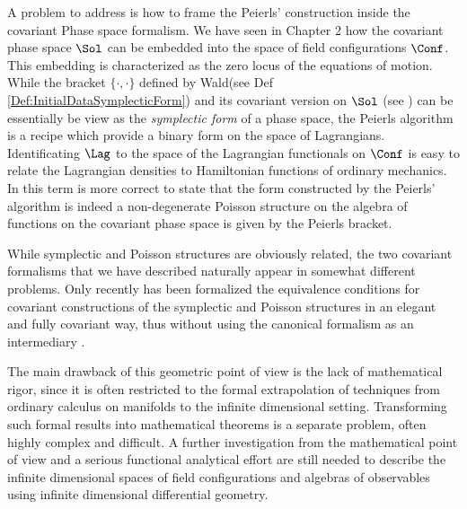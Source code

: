 \documentclass[Main]{subfiles}
\begin{document}
		\vspace{2mm}
		A problem to address is how to frame the Peierls' construction inside the covariant Phase space formalism.
		We have seen in Chapter 2 how the covariant phase space $\Sol$ can be embedded into the space of field configurations $\Conf$.
			This embedding is characterized as the zero locus of the equations of motion. 
			While the bracket $\{\cdot,\cdot\}$ defined by Wald\cite{Wald1994}(see Def \ref{Def:InitialDataSymplecticForm}) and its covariant version on $\Sol$ (see \cite{Khavkine2014}) can be essentially be view as the \emph{symplectic form} of a phase space,
			the Peierls algorithm is a recipe which provide a binary form on the space of Lagrangians.
			Identificating $\Lag$ to the space of the Lagrangian functionals on $\Conf$ is easy to relate the Lagrangian densities to Hamiltonian functions of ordinary mechanics.			
			In this term is more correct to state that the form constructed by the Peierls' algorithm is indeed a non-degenerate Poisson structure on the algebra of functions on the covariant phase space is given by the Peierls bracket.
		
			While symplectic and Poisson structures are obviously related, the two covariant formalisms that we have described naturally appear in somewhat different problems. 
			Only recently has been formalized the equivalence conditions for covariant constructions of the symplectic and Poisson structures in an elegant and fully covariant way, thus without using the canonical formalism as an intermediary \cite{Forger2005}\cite{Khavkine2014}.
				
		The main drawback of this geometric point of view is the lack of mathematical rigor, since it is often restricted to the formal extrapolation of techniques from ordinary calculus on manifolds to the infinite dimensional setting.
		Transforming such formal results into mathematical theorems is a separate problem, often highly complex and difficult.
		A further investigation from the mathematical point of view and a serious functional analytical effort are still needed to describe the infinite dimensional spaces of field configurations and algebras of observables using infinite dimensional differential geometry.
\end{document}
